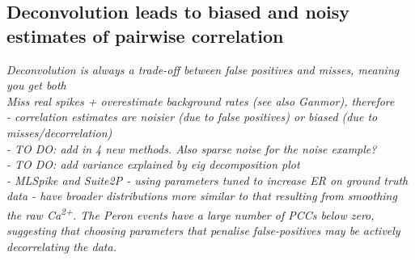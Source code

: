 \documentclass[a4paper]{article}
\begin{document}






\newpage

\subsection{Deconvolution leads to biased and noisy estimates of pairwise correlation}
\emph{Deconvolution is always a trade-off between false positives and misses, meaning you get both\\
Miss real spikes + overestimate background rates (see also Ganmor), therefore\\
\indent - correlation estimates are noisier (due to false positives) or biased (due to misses/decorrelation)\\
\indent - TO DO: add in 4 new methods. Also sparse noise for the noise example?\\
\indent  - TO DO: add variance explained by eig decomposition plot\\
\indent - MLSpike and Suite2P - using parameters tuned to increase ER on ground truth data - have broader distributions more similar to that resulting from smoothing the raw Ca\textsuperscript{2+}. The Peron events have a large number of PCCs below zero, suggesting that choosing parameters that penalise false-positives may be actively decorrelating the data. }
\end{document}
